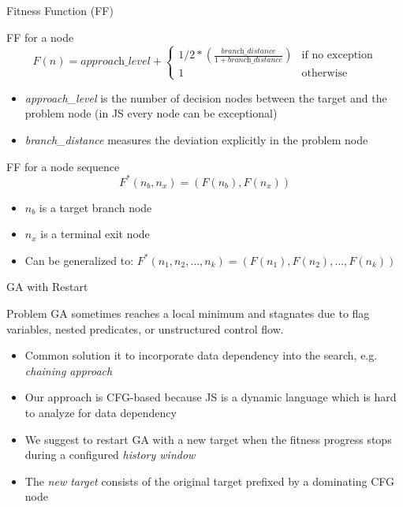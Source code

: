 \documentclass{beamer}
\begin{document}
\begin{frame}{Fitness Function (FF)}
\scriptsize
\begin{block}{FF for a node}
\begin{equation*}
F(n) = \textit{approach\_level} +
\begin{cases}
 1/2 * (\frac{\textit{branch\_distance}}{1 + \textit{branch\_distance}}) & \text{if no exception}\\
 1                                  & \text{otherwise}
\end{cases}
\end{equation*}
\begin{itemize}
  \item \emph{approach\_level} is the number of decision nodes between the target and the problem node (in JS every node can be exceptional)
  \item \emph{branch\_distance} measures the deviation explicitly in the problem node
\end{itemize}
\end{block}

\begin{block}{FF for a node sequence}
  \begin{equation*}
F^*(n_b, n_x) = (F(n_b), F(n_x))
\end{equation*}
\begin{itemize}
\item $n_b$ is a target branch node
\item $n_x$ is a terminal exit node
\item Can be generalized to: $F^*(n_1, n_2, \ldots, n_k) = (F(n_1), F(n_2), \ldots, F(n_k))$
\end{itemize}
\end{block}

\end{frame}

\begin{frame}{GA with Restart}
\begin{block}{Problem}
GA sometimes reaches a local minimum and stagnates due to flag variables, nested predicates, or unstructured control flow.
\end{block}
\begin{itemize}
  \item Common solution it to incorporate data dependency into the search, e.g. \emph{chaining approach}~\cite{ferguson1996chaining}
  \item Our approach is CFG-based because JS is a dynamic language which is hard to analyze for data dependency
  \item We suggest to restart GA with a new target when the fitness progress stops during a configured \emph{history window}
  \item The \emph{new target} consists of the original target prefixed by a dominating CFG node  
\end{itemize}
\end{frame}
\end{document}
